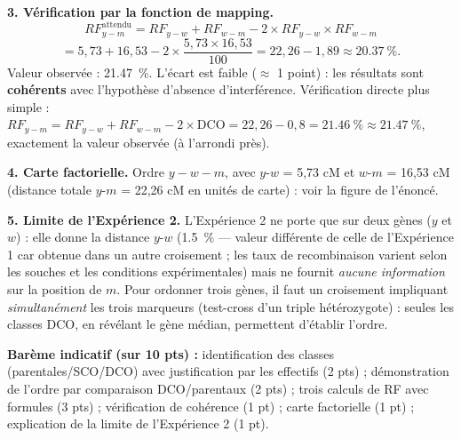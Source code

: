 \documentclass[11pt]{article}
\begin{document}
\begin{corrige}
\textbf{3. Vérification par la fonction de mapping.}
\[ RF_{y-m}^{\text{attendu}} = RF_{y-w} + RF_{w-m} - 2 \times RF_{y-w} \times RF_{w-m} \]
\[ = 5,73 + 16,53 - 2 \times \frac{5,73 \times 16,53}{100} = 22,26 - 1,89 \approx \SI{20,37}{\percent}. \]
Valeur observée : \SI{21,47}{\percent}. L'écart est faible ($\approx$ 1 point) : les résultats sont \textbf{cohérents} avec l'hypothèse d'absence d'interférence. Vérification directe plus simple : $RF_{y-m} = RF_{y-w} + RF_{w-m} - 2 \times \text{DCO} = 22,26 - 0,8 = \SI{21,46}{\percent} \approx \SI{21,47}{\percent}$, exactement la valeur observée (à l'arrondi près).

\textbf{4. Carte factorielle.} Ordre $y - w - m$, avec $y$-$w$ = 5,73 cM et $w$-$m$ = 16,53 cM (distance totale $y$-$m$ = 22,26 cM en unités de carte) : voir la figure de l'énoncé.

\textbf{5. Limite de l'Expérience 2.} L'Expérience 2 ne porte que sur deux gènes ($y$ et $w$) : elle donne la distance $y$-$w$ (\SI{1,5}{\percent} — valeur différente de celle de l'Expérience 1 car obtenue dans un autre croisement ; les taux de recombinaison varient selon les souches et les conditions expérimentales) mais ne fournit \emph{aucune information} sur la position de $m$. Pour ordonner trois gènes, il faut un croisement impliquant \emph{simultanément} les trois marqueurs (test-cross d'un triple hétérozygote) : seules les classes DCO, en révélant le gène médian, permettent d'établir l'ordre.

\textbf{Barème indicatif (sur 10 pts) :} identification des classes (parentales/SCO/DCO) avec justification par les effectifs (2 pts) ; démonstration de l'ordre par comparaison DCO/parentaux (2 pts) ; trois calculs de RF avec formules (3 pts) ; vérification de cohérence (1 pt) ; carte factorielle (1 pt) ; explication de la limite de l'Expérience 2 (1 pt).
\end{corrige}
\end{document}
